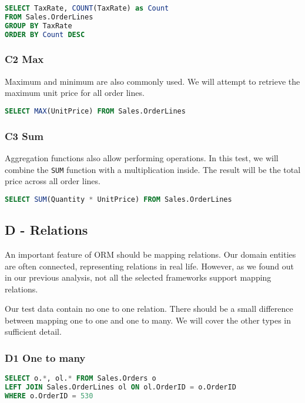 \begin{lstlisting}[language=SQL]
SELECT TaxRate, COUNT(TaxRate) as Count 
FROM Sales.OrderLines 
GROUP BY TaxRate 
ORDER BY Count DESC
\end{lstlisting}

\subsubsection*{C2 Max}
Maximum and minimum are also commonly used. We will attempt to retrieve the maximum unit price for all order lines.

\begin{lstlisting}[language=SQL]
SELECT MAX(UnitPrice) FROM Sales.OrderLines
\end{lstlisting}

\subsubsection*{C3 Sum}
Aggregation functions also allow performing operations. In this test, we will combine the \texttt{SUM} function with a multiplication inside. The result will be the total price across all order lines.
\begin{lstlisting}[language=SQL]
SELECT SUM(Quantity * UnitPrice) FROM Sales.OrderLines
\end{lstlisting}

\subsection{D - Relations}
An important feature of ORM should be mapping relations. Our domain entities are often connected, representing relations in real life.
However, as we found out in our previous analysis, not all the selected frameworks support mapping relations. 

Our test data contain no one to one relation. There should be a small difference between mapping one to one and one to many. We will cover the other types in sufficient detail.

\subsubsection*{D1 One to many}

\begin{lstlisting}[language=SQL]
SELECT o.*, ol.* FROM Sales.Orders o
LEFT JOIN Sales.OrderLines ol ON ol.OrderID = o.OrderID
WHERE o.OrderID = 530
\end{lstlisting}

